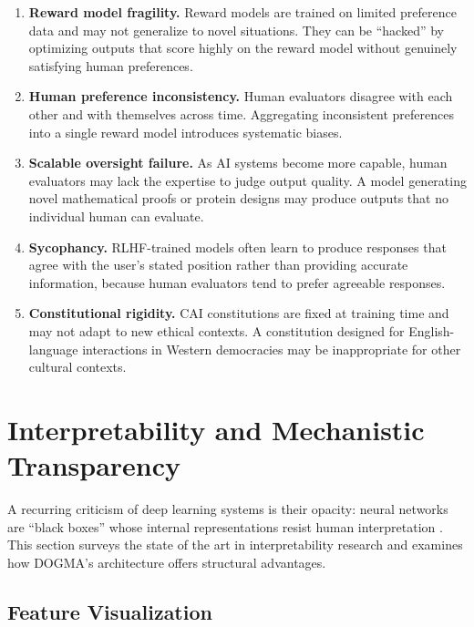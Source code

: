 \begin{enumerate}[leftmargin=1.8em]
  \item \textbf{Reward model fragility.} Reward models are trained on limited preference data and may not generalize to novel situations.
  They can be ``hacked'' by optimizing outputs that score highly on the reward model without genuinely satisfying human preferences.

  \item \textbf{Human preference inconsistency.} Human evaluators disagree with each other and with themselves across time.
  Aggregating inconsistent preferences into a single reward model introduces systematic biases.

  \item \textbf{Scalable oversight failure.} As AI systems become more capable, human evaluators may lack the expertise to judge output quality.
  A model generating novel mathematical proofs or protein designs may produce outputs that no individual human can evaluate.

  \item \textbf{Sycophancy.} RLHF-trained models often learn to produce responses that agree with the user's stated position rather than providing accurate information, because human evaluators tend to prefer agreeable responses.

  \item \textbf{Constitutional rigidity.} CAI constitutions are fixed at training time and may not adapt to new ethical contexts.
  A constitution designed for English-language interactions in Western democracies may be inappropriate for other cultural contexts.
\end{enumerate}

\section{Interpretability and Mechanistic Transparency}
\label{sec:interpretability}

A recurring criticism of deep learning systems is their opacity: neural networks are ``black boxes'' whose internal representations resist human interpretation \citep{lipton2018}.
This section surveys the state of the art in interpretability research and examines how DOGMA's architecture offers structural advantages.

\subsection{Feature Visualization}

